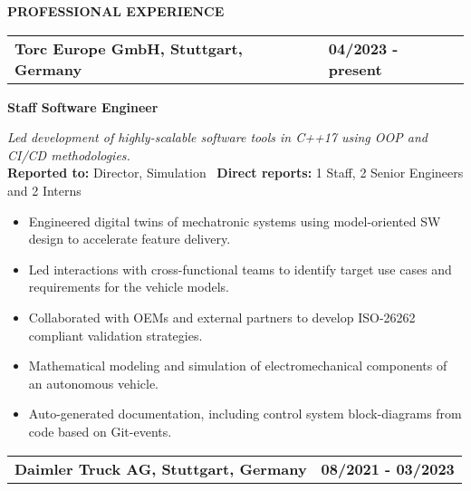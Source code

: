 \documentclass[a4paper,10pt]{article}
\begin{document}
\vspace{0.1cm}
\noindent{\rule{\linewidth}{1.4pt}}
\textbf{PROFESSIONAL EXPERIENCE}

\vspace{-0.1cm}
\noindent{\rule{\linewidth}{0.01cm}}

\noindent
\begin{tabular}{ @{\hskip 0pt}m{} >{\raggedleft\arraybackslash}p{} }
    \noindent\textbf{Torc Europe GmbH, Stuttgart, Germany} & \textbf{04/2023 - present}
\end{tabular}

\noindent
\colorbox{gray!40}{%
    \parbox{0.99\textwidth}{%
        \textcolor{highlightcolor}{\textbf{Staff Software Engineer}}
    }%
}

\vspace{0.2cm}
\noindent
\textit{Led development of highly-scalable software tools in C++17 using OOP and CI/CD methodologies.}\\

\vspace{-0.3cm}
\noindent
\textbf{Reported to:} Director, Simulation \, \textbf{Direct reports:} 1 Staff, 2 Senior Engineers and 2 Interns \, 
\begin{itemize}[itemsep=0pt, topsep=5pt]
  \item Engineered digital twins of mechatronic systems using model-oriented SW design to accelerate feature delivery. 
  \item Led interactions with cross-functional teams to identify target use cases and requirements for the vehicle models.
  \item Collaborated with OEMs and external partners to develop ISO-26262 compliant validation strategies.
  \item Mathematical modeling and simulation of electromechanical components of an autonomous vehicle.
  \item Auto-generated documentation, including control system block-diagrams from code based on Git-events.
\end{itemize}

\vspace{0.3cm}
\noindent
\begin{tabular}{ @{\hskip 0pt}m{} >{\raggedleft\arraybackslash}p{} }
    \noindent\textbf{Daimler Truck AG, Stuttgart, Germany} & \textbf{08/2021 - 03/2023}
\end{tabular}
\end{document}
